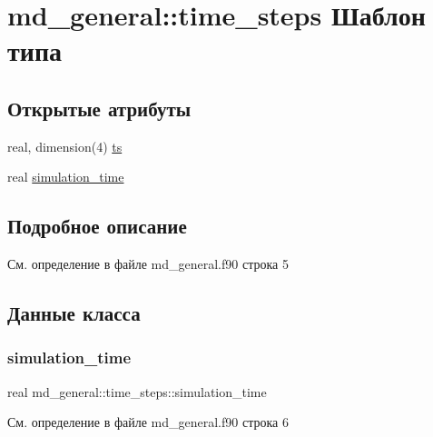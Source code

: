 \hypertarget{structmd__general_1_1time__steps}{}\section{md\+\_\+general\+:\+:time\+\_\+steps Шаблон типа}
\label{structmd__general_1_1time__steps}
\subsection*{Открытые атрибуты}
\begin{DoxyCompactItemize}
\item 
real, dimension(4) \mbox{\hyperlink{structmd__general_1_1time__steps_a132b6c66e670dd482e4394e6a8b2df4c}{ts}}
\item 
real \mbox{\hyperlink{structmd__general_1_1time__steps_a709c67888128a7d1ab64f211438ebd40}{simulation\+\_\+time}}
\end{DoxyCompactItemize}


\subsection{Подробное описание}


См. определение в файле md\+\_\+general.\+f90 строка 5



\subsection{Данные класса}
\mbox{\label{structmd__general_1_1time__steps_a709c67888128a7d1ab64f211438ebd40}} 
\subsubsection{\texorpdfstring{simulation\+\_\+time}{simulation\_time}}
{\footnotesize\ttfamily real md\+\_\+general\+::time\+\_\+steps\+::simulation\+\_\+time}



См. определение в файле md\+\_\+general.\+f90 строка 6

\mbox{\label{structmd__general_1_1time__steps_a132b6c66e670dd482e4394e6a8b2df4c}} 
